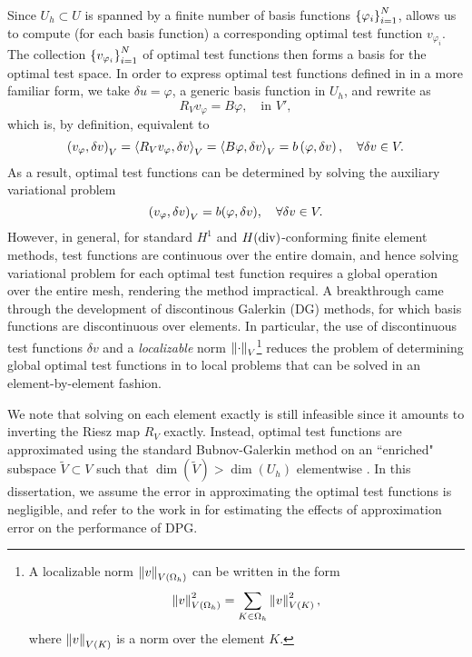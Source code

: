 Since $U_h \subset U$ is spanned by a finite number of basis functions $\LRc{\varphi_i}_{i=1}^N$,  allows us to compute (for each basis function) a corresponding optimal test function $v_{\varphi_i}$. The collection $\LRc{v_{\varphi_i}}_{i = 1}^N$ of optimal test functions then forms a basis for the optimal test space.  In order to express optimal test functions defined in  in a more familiar form, we take  $\delta u = \varphi$, a generic basis function in $U_h$, and rewrite  as
\[
R_Vv_{\varphi} = B\varphi, \quad \text{in } V',
\]
which is, by definition, equivalent to
\[
\LRp{v_\varphi,\delta v}_V = \LRa{R_Vv_\varphi,\delta v}_{V}=
\LRa{B\varphi, \delta v}_V = b\LRp{\varphi,\delta v}, \quad
\forall \delta v \in V.
\]
As a result, optimal test functions can be determined by solving the auxiliary
variational problem
\begin{equation}
\eqnlab{optvVar}
\left(v_\varphi,\delta v\right)_V = b(\varphi,\delta v), \quad \forall
\delta v \in V.
\end{equation}
However, in general, for standard $H^1$ and $H({\rm div})$-conforming finite element methods, test functions are continuous over the entire domain, and hence solving variational problem  for each optimal test function requires a global operation over the entire mesh, rendering the method impractical. A breakthrough came through the development of discontinous Galerkin (DG) methods, for which basis functions are discontinuous over elements. In particular, the use of discontinuous test functions $\delta v$ and a \textit{localizable} norm $\nor{\cdot}_V$\footnote{A localizable norm $\nor{v}_{V(\Oh)}$ can be written in the form 
$$\nor{v}_{V(\Oh)}^2 = \sum_{K\in\Oh} \nor{v}_{V(K)}^2,$$ where $\nor{v}_{V(K)}$ is a norm over the element $K$.} reduces the problem of determining global optimal test functions in  to local problems that can be solved in an element-by-element fashion.

We note that solving  on each element exactly is still infeasible since it amounts to inverting the Riesz map $R_V$ exactly. Instead, optimal test functions are approximated using the standard Bubnov-Galerkin method on an ``enriched" subspace $\tilde{V} \subset V$ such that $\dim(\tilde{V}) > \dim(U_h)$ elementwise \cite{DPG1, DPG2}. In this dissertation, we assume the error in approximating the optimal test functions is negligible, and refer to the work in \cite{practicalDPG} for estimating the effects of approximation error on the performance of DPG.


